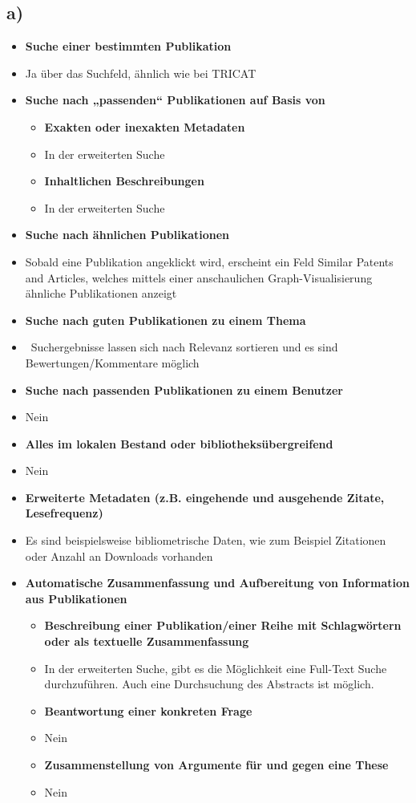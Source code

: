\documentclass[11pt,a4paper,parskip=half ]{scrartcl}
\begin{document}
	\subsection*{a)}
		\begin{itemize}
		\item \textbf{Suche einer bestimmten Publikation}
		\item[] Ja über das Suchfeld, ähnlich wie bei TRICAT
		\item \textbf{Suche nach „passenden“ Publikationen auf Basis von}
		\begin{itemize}
			\item \textbf{Exakten oder inexakten Metadaten}
			\item[] In der erweiterten Suche 
			\item \textbf{Inhaltlichen Beschreibungen}
			\item[] In der erweiterten Suche
		\end{itemize}
		\item \textbf{Suche nach ähnlichen Publikationen}
		\item[] Sobald eine Publikation angeklickt wird, erscheint ein Feld \glqq{}Similar Patents and Articles\grqq{}, welches mittels einer anschaulichen Graph-Visualisierung ähnliche Publikationen anzeigt
		\item \textbf{Suche nach \glqq{}guten\grqq{} Publikationen zu einem Thema}
		\item[] Suchergebnisse lassen sich nach Relevanz sortieren und es sind Bewertungen/Kommentare möglich
		\item \textbf{Suche nach \glqq{}passenden\grqq{} Publikationen zu einem Benutzer}
		\item[] Nein
		\item \textbf{Alles im lokalen Bestand oder bibliotheksübergreifend}
		\item[] Nein
		\item \textbf{Erweiterte Metadaten (z.B. eingehende und ausgehende Zitate, Lesefrequenz)}
		\item[] Es sind beispielsweise bibliometrische Daten, wie zum Beispiel Zitationen oder Anzahl an Downloads vorhanden
		\item \textbf{Automatische Zusammenfassung und Aufbereitung von Information aus
		Publikationen}	
		\begin{itemize}
			\item \textbf{Beschreibung einer Publikation/einer Reihe mit Schlagwörtern oder als textuelle Zusammenfassung}
			\item[] In der erweiterten Suche, gibt es die Möglichkeit eine Full-Text Suche durchzuführen. Auch eine Durchsuchung des Abstracts ist möglich.
			\item \textbf{Beantwortung einer konkreten Frage}
			\item[] Nein
			\item \textbf{Zusammenstellung von Argumente für und gegen eine These}
			\item[] Nein
		\end{itemize}
	\end{itemize}
\end{document}
